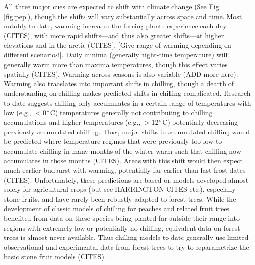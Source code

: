 \documentclass[11pt,letter]{article}
\begin{document}
All three major cues are expected to shift with climate change (See Fig. \ref{fig:pep}), though the shifts will vary substantially across space and time. Most notably to date, warming increases the forcing plants experience each day (CITES), with more rapid shifts---and thus also greater shifts---at higher elevations and in the arctic (CITES). [Give range of warming depending on different scenarios!]. Daily minima (generally night-time temperature) will; generally warm more than maxima temperatures, though this effect varies spatially (CITES). Warming across seasons is also variable (ADD more here). \\
Warming also translates into important shifts in chilling, though a dearth of understanding on chilling makes predicted shifts in chilling complicated. Research to date suggests chilling only accumulates in a certain range of temperatures with low (e.g., $<$0$\degree$C) temperatures generally not contributing to chilling accumulations and higher temperatures (e.g., $>$12$\degree$C) potentially decreasing previously accumulated chilling. Thus, major shifts in accumulated chilling would be predicted where temperature regimes that were previously too low to accumulate chilling in many months of the winter warm such that chilling now accumulates in those months (CITES). Areas with this shift would then expect much earlier budburst with warming, potentially far earlier than last frost dates (CITES). Unfortunately, these predictions are based on models developed almost solely for agricultural crops (but see HARRINGTON CITES etc.), especially stone fruits, and have rarely been robustly adapted to forest trees. While the development of classic models of chilling for peaches and related fruit trees benefited from data on these species being planted far outside their range into regions with extremely low or potentially no chilling, equivalent data on forest trees is almost never available. Thus chilling models to date generally use limited observational and experimental data from forest trees to try to reparametrize the basic stone fruit models (CITES).\\
\end{document}
